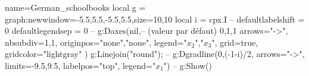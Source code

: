 \documentclass{standalone}
\begin{document}
\tikzset{%
>=latex
}
\begin{luadraw}{name=German_schoolbooks}
local g = graph:new{window={-5.5,5.5,-5.5,5.5},size={10,10}}
local i = cpx.I
--
defaultlabelshift = 0
defaultlegendsep = 0
--
g:Daxes(nil,-- (valeur par défaut) {0,1,1}
    {
        arrows="->",
        nbsubdiv={1,1},
        originpos={"none","none"},
        legend={"$x_2$","$x_3$"},
        grid=true,
        gridcolor="lightgray"
    })
g:Linejoin("round"); 
--
g:Dgradline({0,(-1-i)/2}, {arrows="->", limits={-9.5,9.5}, labelpos="top", legend="$x_1$"})
--
g:Show()
\end{luadraw}
\end{document}
